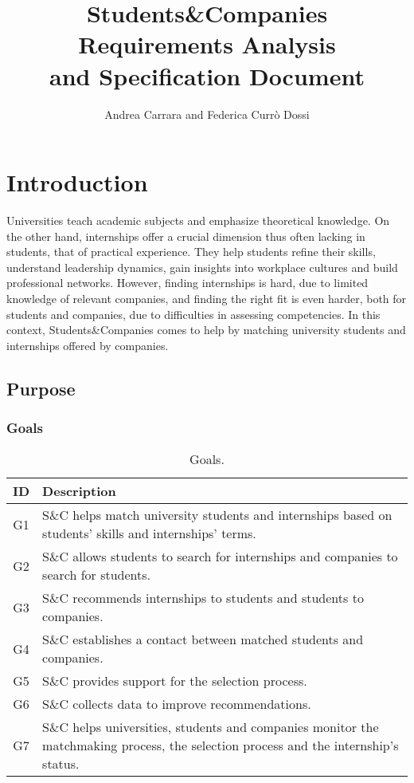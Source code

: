 \documentclass[a4paper, oneside]{book}
\title{
    Students\&Companies \\
    \Huge Requirements Analysis \\
    and Specification Document
}
\author{Andrea Carrara and Federica Currò Dossi}
\begin{document}
\maketitle

\tableofcontents

\chapter{Introduction}
Universities teach academic subjects and emphasize theoretical knowledge.
On the other hand, internships offer a crucial dimension thus often lacking in students, that of practical experience.
They help students refine their skills, understand leadership dynamics, gain insights into workplace cultures and build professional networks.
However, finding internships is hard, due to limited knowledge of relevant companies, and finding the right fit is even harder, both for students and companies, due to difficulties in assessing competencies.
In this context, Students\&Companies comes to help by matching university students and internships offered by companies.

\section{Purpose}
\subsection{Goals}
\begin{table}[h]
\renewcommand{\arraystretch}{1.5}
\begin{tabular}{|c|p{10.5 cm}|}
    \hline
    \textbf{ID} & \textbf{Description} \\ \hline \hline
    G1 & S\&C helps match university students and internships based on students' skills and internships' terms. \\ \hline
    G2 & S\&C allows students to search for internships and companies to search for students. \\ \hline
    G3 & S\&C recommends internships to students and students to companies. \\ \hline
    G4 & S\&C establishes a contact between matched students and companies. \\ \hline
    G5 & S\&C provides support for the selection process. \\ \hline
    G6 & S\&C collects data to improve recommendations. \\ \hline
    G7 & S\&C helps universities, students and companies monitor the matchmaking process, the selection process and the internship's status. \\ \hline
\end{tabular}
\caption{Goals.}
\end{table}
\end{document}
